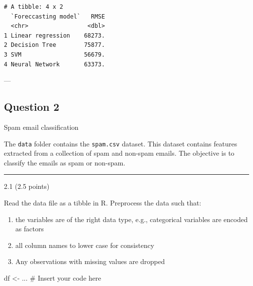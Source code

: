 \documentclass[
  letterpaper,
  DIV=11,
  numbers=noendperiod]{scrartcl}
\newenvironment{Shaded}{\begin{snugshade}}{\end{snugshade}}
\newcommand{\CommentTok}[1]{\textcolor[rgb]{0.37,0.37,0.37}{#1}}
\newcommand{\NormalTok}[1]{\textcolor[rgb]{0.00,0.23,0.31}{#1}}
\newcommand{\OtherTok}[1]{\textcolor[rgb]{0.00,0.23,0.31}{#1}}
\providecommand{\tightlist}{%
  \setlength{\itemsep}{0pt}\setlength{\parskip}{0pt}}\usepackage{longtable,booktabs,array}
\begin{document}
\begin{verbatim}
# A tibble: 4 x 2
  `Foreccasting model`   RMSE
  <chr>                 <dbl>
1 Linear regression    68273.
2 Decision Tree        75877.
3 SVM                  56679.
4 Neural Network       63373.
\end{verbatim}

---

\hypertarget{question-2}{%
\subsection{Question 2}\label{question-2}}

\begin{tcolorbox}[enhanced jigsaw, bottomtitle=1mm, rightrule=.15mm, left=2mm, colback=white, opacityback=0, bottomrule=.15mm, titlerule=0mm, toprule=.15mm, colframe=quarto-callout-tip-color-frame, arc=.35mm, colbacktitle=quarto-callout-tip-color!10!white, breakable, leftrule=.75mm, coltitle=black, title=\textcolor{quarto-callout-tip-color}{\faLightbulb}\hspace{0.5em}{50 points}, opacitybacktitle=0.6, toptitle=1mm]

Spam email classification

\end{tcolorbox}

The \texttt{data} folder contains the \texttt{spam.csv} dataset. This
dataset contains features extracted from a collection of spam and
non-spam emails. The objective is to classify the emails as spam or
non-spam.

\begin{center}\rule{0.5\linewidth}{0.5pt}\end{center}

2.1 (2.5 points)

Read the data file as a tibble in R. Preprocess the data such that:

\begin{enumerate}
\def\labelenumi{\arabic{enumi}.}
\tightlist
\item
  the variables are of the right data type, e.g., categorical variables
  are encoded as factors
\item
  all column names to lower case for consistency
\item
  Any observations with missing values are dropped
\end{enumerate}

\begin{Shaded}
\begin{Highlighting}[]
\NormalTok{df }\OtherTok{\textless{}{-}}\NormalTok{ ... }\CommentTok{\# Insert your code here}
\end{Highlighting}
\end{Shaded}
\end{document}
